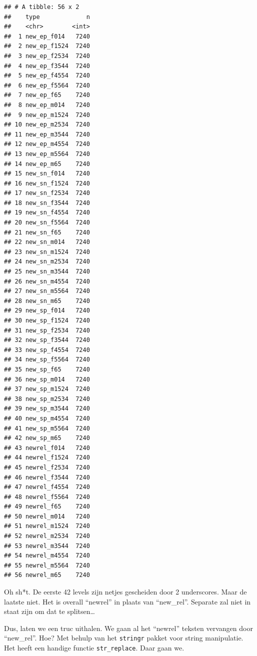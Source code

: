 \documentclass[]{tufte-book}
\newenvironment{Shaded}{}{}
\newcommand{\DataTypeTok}[1]{\textcolor[rgb]{0.56,0.13,0.00}{#1}}
\newcommand{\KeywordTok}[1]{\textcolor[rgb]{0.00,0.44,0.13}{\textbf{#1}}}
\newcommand{\NormalTok}[1]{#1}
\newcommand{\OperatorTok}[1]{\textcolor[rgb]{0.40,0.40,0.40}{#1}}
\newcommand{\OtherTok}[1]{\textcolor[rgb]{0.00,0.44,0.13}{#1}}
\newcommand{\StringTok}[1]{\textcolor[rgb]{0.25,0.44,0.63}{#1}}
\begin{document}
\begin{verbatim}
## # A tibble: 56 x 2
##    type             n
##    <chr>        <int>
##  1 new_ep_f014   7240
##  2 new_ep_f1524  7240
##  3 new_ep_f2534  7240
##  4 new_ep_f3544  7240
##  5 new_ep_f4554  7240
##  6 new_ep_f5564  7240
##  7 new_ep_f65    7240
##  8 new_ep_m014   7240
##  9 new_ep_m1524  7240
## 10 new_ep_m2534  7240
## 11 new_ep_m3544  7240
## 12 new_ep_m4554  7240
## 13 new_ep_m5564  7240
## 14 new_ep_m65    7240
## 15 new_sn_f014   7240
## 16 new_sn_f1524  7240
## 17 new_sn_f2534  7240
## 18 new_sn_f3544  7240
## 19 new_sn_f4554  7240
## 20 new_sn_f5564  7240
## 21 new_sn_f65    7240
## 22 new_sn_m014   7240
## 23 new_sn_m1524  7240
## 24 new_sn_m2534  7240
## 25 new_sn_m3544  7240
## 26 new_sn_m4554  7240
## 27 new_sn_m5564  7240
## 28 new_sn_m65    7240
## 29 new_sp_f014   7240
## 30 new_sp_f1524  7240
## 31 new_sp_f2534  7240
## 32 new_sp_f3544  7240
## 33 new_sp_f4554  7240
## 34 new_sp_f5564  7240
## 35 new_sp_f65    7240
## 36 new_sp_m014   7240
## 37 new_sp_m1524  7240
## 38 new_sp_m2534  7240
## 39 new_sp_m3544  7240
## 40 new_sp_m4554  7240
## 41 new_sp_m5564  7240
## 42 new_sp_m65    7240
## 43 newrel_f014   7240
## 44 newrel_f1524  7240
## 45 newrel_f2534  7240
## 46 newrel_f3544  7240
## 47 newrel_f4554  7240
## 48 newrel_f5564  7240
## 49 newrel_f65    7240
## 50 newrel_m014   7240
## 51 newrel_m1524  7240
## 52 newrel_m2534  7240
## 53 newrel_m3544  7240
## 54 newrel_m4554  7240
## 55 newrel_m5564  7240
## 56 newrel_m65    7240
\end{verbatim}

Oh sh*t. De eerste 42 levels zijn netjes gescheiden door 2 underscores. Maar de laatste niet. Het is overall ``newrel'' in plaats van ``new\_rel''. Separate zal niet in staat zijn om dat te splitsen\ldots{}

Dus, laten we een truc uithalen. We gaan al het ``newrel'' teksten vervangen door ``new\_rel''. Hoe? Met behulp van het \texttt{stringr} pakket voor string manipulatie. Het heeft een handige functie \texttt{str\_replace}. Daar gaan we.

\begin{Shaded}
\end{Shaded}
\end{document}
